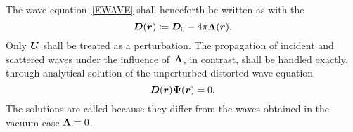 The wave equation~\cref{EWAVE} shall henceforth be written as
with the 
%
%
%
\begin{equation}
  \bm{D}(\bm{r}) \coloneqq \bm{D}_0 - 4\pi\bm{\Lambda}(\bm{r}).
\end{equation}
Only $\bm{U}$ shall be treated as a perturbation.
The propagation of incident and scattered waves under the influence of~$\bm{\Lambda}$,
in contrast,
shall be handled exactly,
through analytical solution of the unperturbed distorted wave equation
%
%
%
\begin{equation}\label{EDPsi0}
  \bm{D}(\bm{r})\bm{\Psi}(\bm{r}) = 0.
\end{equation}
The solutions are called 
%
%
because they differ from the  waves
%
%
obtained in the vacuum case $\bm{\Lambda}=0$.
%

